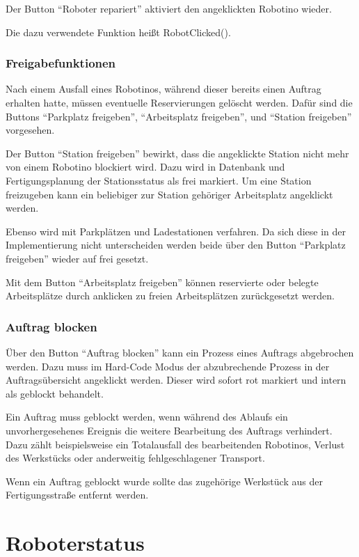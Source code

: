 Der Button "`Roboter repariert"' aktiviert den angeklickten Robotino wieder. 

Die dazu verwendete Funktion heißt RobotClicked().

\subsubsection{Freigabefunktionen}

Nach einem Ausfall eines Robotinos, während dieser bereits einen Auftrag erhalten hatte, müssen eventuelle Reservierungen gelöscht werden. Dafür sind die Buttons "`Parkplatz freigeben"', "`Arbeitsplatz freigeben"', und "`Station freigeben"' vorgesehen.

Der Button "`Station freigeben"' bewirkt, dass die angeklickte Station nicht mehr von einem Robotino blockiert wird. Dazu wird in Datenbank und Fertigungsplanung der Stationsstatus als frei markiert. Um eine Station freizugeben kann ein beliebiger zur Station gehöriger Arbeitsplatz angeklickt werden.

Ebenso wird mit Parkplätzen und Ladestationen verfahren. Da sich diese in der Implementierung nicht unterscheiden werden beide über den Button "`Parkplatz freigeben"' wieder auf frei gesetzt. 

Mit dem Button "`Arbeitsplatz freigeben"' können reservierte oder belegte Arbeitsplätze durch anklicken zu freien Arbeitsplätzen zurückgesetzt werden. 

\subsubsection{Auftrag blocken}

Über den Button "`Auftrag blocken"' kann ein Prozess eines Auftrags abgebrochen werden. Dazu muss im Hard-Code Modus der abzubrechende Prozess in der Auftragsübersicht angeklickt werden. Dieser wird sofort rot markiert und intern als geblockt behandelt. 

Ein Auftrag muss geblockt werden, wenn während des Ablaufs ein unvorhergesehenes Ereignis die weitere Bearbeitung des Auftrags verhindert. Dazu zählt beispielsweise ein Totalausfall des bearbeitenden Robotinos, Verlust des Werkstücks oder anderweitig fehlgeschlagener Transport. 

Wenn ein Auftrag geblockt wurde sollte das zugehörige Werkstück aus der Fertigungsstraße entfernt werden. 

\section{Roboterstatus}

